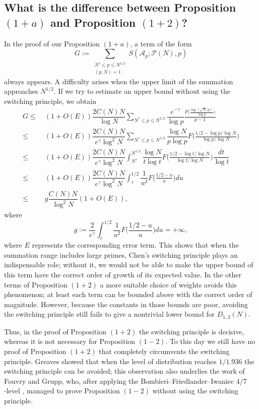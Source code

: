 \documentclass[12pt, a4paper]{amsart}
\def\le{\leqslant}
\theoremstyle{plain}
\theoremstyle{remark}
\numberwithin{equation}{section}
\begin{document}
\subsection{What is the difference between Proposition $(1+a)$ and Proposition $(1+2)$?} 
In the proof of our Proposition $(1+a)$, a term of the form
\[
G:=\sum_{\substack{N^{\tau}\le p\le N^{1/2} \\ (p,N)=1}} S(\mathscr{A}_p;\mathscr{P}(N),p)
\]
always appears. 
A difficulty arises when the upper limit of the summation approaches $N^{1/2}$.
If we try to estimate an upper bound without using the switching principle, we obtain
\begin{equation}
\begin{aligned}
G\le\ & (1+O(E))\dfrac{2C(N)N}{\log N}\sum_{N^{\tau} \le p\le N^{1/2}}\dfrac{e^{-\gamma}}{\log p} \frac{F\big(\frac{\log (\sqrt{N} / p)}{\log p}\big)}{p-1} \\
\le\ & (1+O(E))\dfrac{2C(N)N}{e^{\gamma}\log ^2N}\sum_{N^{\tau} \le p\le N^{1/2}}\dfrac{\log N}{p\log p}F\bigg(\frac{1/2-\log p/\log N}{\log p/\log N}\bigg)\\
\le\ & (1+O(E))\dfrac{2C(N)N}{e^\gamma\log ^2N}\int_{N^{\tau}}^{N^{1/2}} \dfrac{\log N}{t\log t}F\bigg(\frac{1/2-\log t/\log N}{\log t/\log N}\bigg)\dfrac{dt}{\log t}\\
\le\ & (1+O(E))\dfrac{2C(N)N}{e^\gamma\log ^2N}\int_{\tau}^{1/2} \dfrac{1}{u^2}F\bigg(\frac{1/2-u}{u}\bigg)du\\
\le\ &  g \dfrac{C(N)N}{\log^2 N}(1+O(E)),
\end{aligned}
\end{equation}
where
\begin{equation}
g:= \frac{2}{e^\gamma}\int_{\tau}^{1/2} \dfrac{1}{u^2}F\bigg(\frac{1/2-u}{u}\bigg)du=+\infty,
\end{equation}
where $E$ represents the corresponding error term. 
This shows that when the summation range includes large primes, Chen's switching principle plays an indispensable role; without it, we would not be able to make the upper bound of this term have the correct order of growth of its expected value. 
In the other terms of Proposition $(1+2)$ a more suitable choice of weights avoids this phenomenon; at least each term can be bounded above with the correct order of magnitude. 
However, because the constants in those bounds are poor, avoiding the switching principle still fails to give a nontrivial lower bound for $D_{1,2}(N)$.

Thus, in the proof of Proposition $(1+2)$ the switching principle is decisive, whereas it is not 
necessary for Proposition $(1-2)$. 
To this day we still have no proof of Proposition $(1+2)$ that completely circumvents the switching principle. 
Greaves\cite{Gr82} showed that when the level of distribution reaches $1/1.936$ the switching principle can be avoided; this observation also underlies the work of Fouvry and Grupp\cite{FG86}, who, after applying the Bombieri--Friedlander--Iwaniec $4/7$‑level \cite{BFI86}, managed to prove Proposition $(1-2)$ without using the switching principle.
\end{document}

